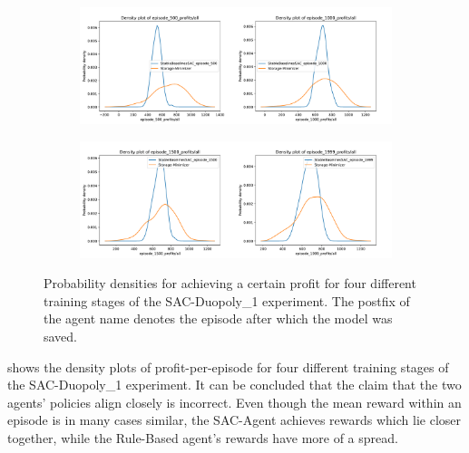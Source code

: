 \begin{figure}
	\begin{subfigure}{\textwidth}
		\centering
		\includegraphics[width = \textwidth]{images/experiments/SACDuopoly/SACDuopolyProfitsDensity1_2.pdf}\\[1 ex]
	\end{subfigure}
	\begin{subfigure}{\textwidth}
		\centering
		\includegraphics[width = \textwidth]{images/experiments/SACDuopoly/SACDuopolyProfitsDensity3_4.pdf}\\[1 ex]
	\end{subfigure}
	\caption{Probability densities for achieving a certain profit for four different training stages of the SAC-Duopoly\_1 experiment. The postfix of the agent name denotes the episode after which the model was saved.}\label{fig:SACDuopolyProfitsDensity}
\end{figure}

 shows the density plots of profit-per-episode for four different training stages of the SAC-Duopoly\_1 experiment. It can be concluded that the claim that the two agents' policies align closely is incorrect. Even though the mean reward within an episode is in many cases similar, the SAC-Agent achieves rewards which lie closer together, while the Rule-Based agent's rewards have more of a spread.

